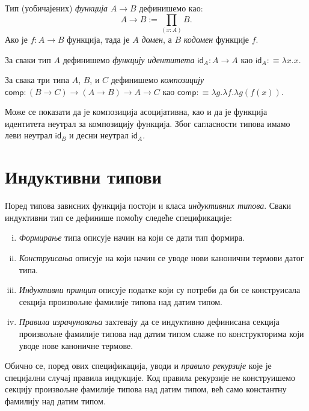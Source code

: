 \documentclass[12pt,oneside]{memoir}
\begin{document}
\begin{definition}
    Тип (уобичајених) \emph{функција} $A \to B$ дефинишемо као:
    \[A \to B:= \prod_{(x:A)} B.\]
    Ако је $f : A \to B$ функција, тада је $A$ \emph{домен}, а $B$ \emph{кодомен} функције $f$. 
\end{definition}

\begin{definition}
    За сваки тип $A$ дефинишемо \emph{функцију идентитета} $\mathsf{id}_A : A \to A$ као $\mathsf{id}_A :\equiv \lambda x.x$.
\end{definition}

\begin{definition}
    За свака три типа $A$, $B$, и $C$ дефинишемо \emph{композицију} $\mathsf{comp} : (B \to C) \to (A \to B) \to A \to C$ као $\mathsf{comp} :\equiv \lambda g.\lambda f.\lambda  g(f(x))$.
\end{definition}
Може се показати да је композиција асоцијативна, као и да је функција идентитета неутрал за композицију функција. Због сагласности типова имамо леви неутрал $\mathsf{id}_B$ и десни неутрал $\mathsf{id}_A$.

\section{Индуктивни типови}

Поред типова зависних функција постоји и класа \emph{индуктивних типова}. Сваки индуктивни тип се дефинише помоћу следеће спецификације: 

\begin{enumerate}[(i)]
    \item{\emph{Формирање} типа описује начин на који се дати тип формира.}
    \item{\emph{Конструисања} описује на који начин се уводе нови канонични термови датог типа.}
    \item{\emph{Индуктивни принцип} описује податке који су потреби да би се конструисала секција произвољне фамилије типова над датим типом.}
    \item{\emph{Правила израчунавања} захтевају да се индуктивно дефинисана секција произвољне фамилије типова над датим типом слаже по конструкторима који уводе нове каноничне термове.}
\end{enumerate}

Обично се, поред ових спецификација, уводи и \emph{правило рекурзије} које је специјални случај правила индукције. Код правила рекурзије не конструишемо секцију произвољне фамилије типова над датим типом, већ само константну фамилију над датим типом.
\end{document}

